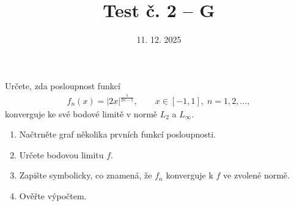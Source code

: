 \documentclass{article}
\begin{document}
\title{Test č. 2 -- G}
\date{11. 12. 2025}
\author{}
\maketitle


\noindent
Určete, zda posloupnost funkcí
\begin{align*}
        f_n(x) = |2x|^{\frac{1}{2n-1}}, \qquad x\in[-1,1],\; n=1,2,\ldots,
\end{align*}
konverguje ke své bodové limitě v normě $L_2$ a $L_\infty$.

\vspace{2cm}

\begin{enumerate}
\item Načtrněte graf několika prvních funkcí posloupnosti.
\item Určete bodovou limitu $f$.
\item Zapište symbolicky, co znamená, že $f_n$ konverguje k $f$ ve zvolené normě.
\item Ověřte výpočtem.
\end{enumerate}

\end{document}
